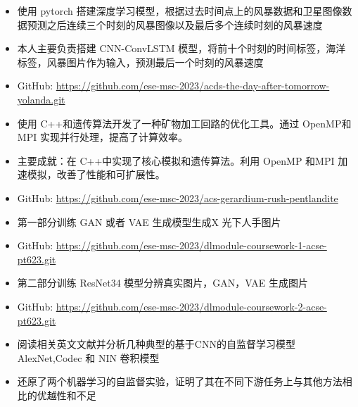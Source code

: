 \documentclass{resume}
\begin{document}
\begin{itemize}
  \item 使用 pytorch 搭建深度学习模型，根据过去时间点上的风暴数据和卫星图像数据预测之后连续三个时刻的风暴图像以及最后多个连续时刻的风暴速度
  \item 本人主要负责搭建 CNN-ConvLSTM 模型，将前十个时刻的时间标签，海洋标签，风暴图片作为输入，预测最后一个时刻的风暴速度
  \item GitHub: \href{https://github.com/ese-msc-2023/acds-the-day-after-tomorrow-yolanda.git}{https://github.com/ese-msc-2023/acds-the-day-after-tomorrow-yolanda.git}
\end{itemize}

\begin{itemize}
  \item 使用 C++和遗传算法开发了一种矿物加工回路的优化工具。通过 OpenMP和 MPI 实现并行处理，提高了计算效率。
  \item 主要成就：在 C++中实现了核心模拟和遗传算法。利用 OpenMP 和MPI 加速模拟，改善了性能和可扩展性。
  \item GitHub: \href{ https://github.com/ese-msc-2023/acs-gerardium-rush-pentlandite}{ https://github.com/ese-msc-2023/acs-gerardium-rush-pentlandite}
\end{itemize}

\begin{itemize}
  \item 第一部分训练 GAN 或者 VAE 生成模型生成X 光下人手图片
  \item GitHub: \href{ https://github.com/ese-msc-2023/dlmodule-coursework-1-acse-pt623.git}{ https://github.com/ese-msc-2023/dlmodule-coursework-1-acse-pt623.git}
  \item 第二部分训练 ResNet34 模型分辨真实图片，GAN，VAE 生成图片
  \item GitHub: \href{ https://github.com/ese-msc-2023/dlmodule-coursework-2-acse-pt623.git}{ https://github.com/ese-msc-2023/dlmodule-coursework-2-acse-pt623.git}
\end{itemize}

\begin{itemize}
  \item 阅读相关英文文献并分析几种典型的基于CNN的自监督学习模型AlexNet,Codec 和 NIN 卷积模型
  \item 还原了两个机器学习的自监督实验，证明了其在不同下游任务上与其他方法相比的优越性和不足
\end{itemize}
\end{document}
